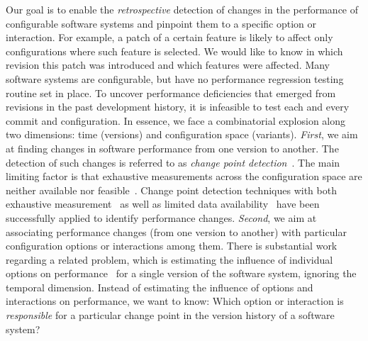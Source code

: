 \documentclass[sigconf, screen]{acmart}
\begin{document}
	Our goal is to enable the \emph{retrospective} detection of changes in the performance of configurable software systems and pinpoint them to a specific option or interaction. For example, a patch of a certain feature is likely to affect only configurations where such feature is selected. 
	We would like to know in which revision this patch was introduced and which features were affected.
	Many software systems are configurable, but have no performance regression testing routine set in place. 
	To uncover performance deficiencies that emerged from revisions in the past development history, it is infeasible to test each and every commit and configuration. 
	In essence, we face a combinatorial explosion along two dimensions: time (versions) and configuration space (variants).
	\emph{First}, we aim at finding changes in software performance from one version to another.
	The detection of such changes is referred to as \emph{change point detection}~\cite{daly_industry_2020,cityIdentifying2014,huang_performance_2014,muhlbauer_accurate_2019,sandoval_alcocer_learning_2016,alcocer_prioritizing_2020}.
	The main limiting factor is that exhaustive measurements across the configuration space are neither available nor feasible~\cite{white_selecting_2009}.
	Change point detection techniques with both exhaustive measurement~\cite{cityIdentifying2014,daly_industry_2020} as well as limited data availability~\cite{sandoval_alcocer_learning_2016,alcocer_prioritizing_2020,huang_performance_2014,muhlbauer_accurate_2019} have been successfully applied to identify performance changes.
	\emph{Second}, we aim at associating performance changes (from one version to another) with particular configuration options or interactions among them.
	There is substantial work  regarding a related problem, which is estimating the influence of individual options on performance~\cite{siegmundPredictingPerformanceAutomated2012,siegmundPerformanceinfluenceModelsHighly2015,sarkarCostEfficientSamplingPerformance,haDeepPerf2019} for a single version of the software system, ignoring the temporal dimension. Instead of estimating the influence of options and interactions on performance, we want to know: Which option or interaction is \emph{responsible} for a particular change point in the version history of a software system?
	
\end{document}
